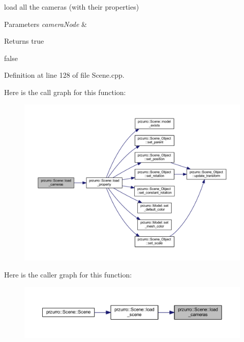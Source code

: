 load all the cameras (with their properties) 


\begin{DoxyParams}{Parameters}
{\em camera\+Node} & \\
\hline
\end{DoxyParams}
\begin{DoxyReturn}{Returns}
true 

false 
\end{DoxyReturn}


Definition at line 128 of file Scene.\+cpp.

Here is the call graph for this function\+:
\nopagebreak
\begin{figure}[H]
\begin{center}
\leavevmode
\includegraphics[width=350pt]{d8/d56/classprzurro_1_1_scene_aafbe64cd67261b27b15fa3219027455e_cgraph}
\end{center}
\end{figure}
Here is the caller graph for this function\+:
\nopagebreak
\begin{figure}[H]
\begin{center}
\leavevmode
\includegraphics[width=350pt]{d8/d56/classprzurro_1_1_scene_aafbe64cd67261b27b15fa3219027455e_icgraph}
\end{center}
\end{figure}
\mbox{\label{classprzurro_1_1_scene_a50cf7c0482f02880a64bfa7c270f61ca}} 
